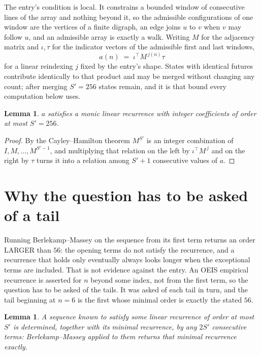 \documentclass[11pt,a4paper]{article}
\theoremstyle{plain}
\newtheorem{lemma}[theorem]{Lemma}
\theoremstyle{definition}
\begin{document}
The entry's condition is local. It constrains a bounded window of consecutive lines of the
array and nothing beyond it, so the admissible configurations of one window are the vertices of
a finite digraph, an edge joins $u$ to $v$ when $v$ may follow $u$, and an admissible array is
exactly a walk. Writing $M$ for the adjacency matrix and $\iota,\tau$ for the indicator vectors
of the admissible first and last windows,
\[
a(n)\;=\;\iota^{\!\top}M^{\,j(n)}\tau
\]
for a linear reindexing $j$ fixed by the entry's shape. States with identical futures
contribute identically to that product and may be merged without changing any count; after
merging $S'=256$ states remain, and it is that bound every computation below uses.

\begin{lemma}\label{lem:cf}
$a$ satisfies a monic linear recurrence with integer coefficients of order at most $S'=256$.
\end{lemma}

\begin{proof}
By the Cayley--Hamilton theorem $M^{S'}$ is an integer combination of $I,M,\dots,M^{S'-1}$,
and multiplying that relation on the left by $\iota^{\!\top}M^{\,j}$ and on the right by
$\tau$ turns it into a relation among $S'+1$ consecutive values of $a$.
\end{proof}

\section{Why the question has to be asked of a tail}

Running Berlekamp--Massey on the sequence from its first term returns an order LARGER than $56$: the opening terms do not satisfy the recurrence, and a recurrence that holds only eventually always looks longer when the exceptional terms are included. That is not evidence against the entry. An OEIS empirical recurrence is asserted for $n$ beyond some index, not from the first term, so the question has to be asked of the tails. It was asked of each tail in turn, and the tail beginning at $n=6$ is the first whose minimal order is exactly the stated $56$.

\begin{lemma}\label{lem:bm}
A sequence known to satisfy some linear recurrence of order at most $S'$ is determined,
together with its minimal recurrence, by any $2S'$ consecutive terms: Berlekamp--Massey applied
to them returns that minimal recurrence exactly.
\end{lemma}
\end{document}
